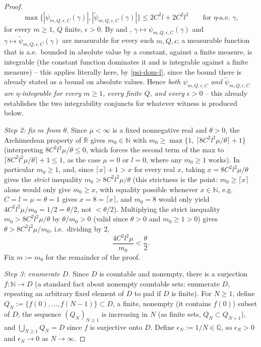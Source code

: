 \begin{proof}
  \begin{equation}\label{psi-dom-l}
    \max\{|\psi_{m,Q,\epsilon,C}(\gamma)|, |\tilde\psi_{m,Q,\epsilon,C}(\gamma)|\} \le 2C^2l+2C^2l^2
    \qquad\text{for } \eta\text{-a.e.\ }\gamma
    ,
  \end{equation}
  for every $m\ge1$, $Q$ finite, $\epsilon>0$. By  and
  , $\gamma\mapsto\psi_{m,Q,\epsilon,C}(\gamma)$ and
  $\gamma\mapsto\tilde\psi_{m,Q,\epsilon,C}(\gamma)$ are measurable for every such $m,Q,\epsilon$; a
  measurable function that is a.e.\ bounded in absolute value by a constant, against a finite
  measure, is integrable (the constant function dominates it and is integrable against a finite
  measure) -- this applies literally here, by \eqref{psi-dom-l}, since the bound there is already
  stated as a bound on absolute values. Hence \emph{both $\psi_{m,Q,\epsilon,C}$ and
  $\tilde\psi_{m,Q,\epsilon,C}$ are
  $\eta$-integrable for every $m\ge1$, every finite $Q$, and every $\epsilon>0$} -- this already
  establishes the two integrability conjuncts for whatever witness is produced below.

  \emph{Step 2: fix $m$ from $\theta$.} Since $\mu<\infty$ is a fixed nonnegative real and $\theta>0$,
  the Archimedean property of $\mathbb{R}$ gives $m_0 \in \mathbb{N}$ with
  $m_0 \ge \max\{1,\ \lceil 8C^2l^2\mu/\theta\rceil+1\}$ (interpreting $8C^2l^2\mu/\theta \le 0$, which
  forces the second term of the max to $\lceil 8C^2l^2\mu/\theta\rceil+1 \le 1$, as the case $\mu=0$
  or $l=0$, where any $m_0\ge1$ works). In particular $m_0\ge1$, and, since
  $\lceil x\rceil+1 > x$ for every real $x$, taking $x=8C^2l^2\mu/\theta$ gives the \emph{strict}
  inequality $m_0 > 8C^2l^2\mu/\theta$ (this strictness is the point: $m_0\ge\lceil x\rceil$ alone
  would only give $m_0\ge x$, with equality possible whenever $x\in\mathbb{N}$, e.g.\
  $C=l=\mu=\theta=1$ gives $x=8=\lceil x\rceil$, and $m_0=8$ would only yield
  $4C^2l^2\mu/m_0=1/2=\theta/2$, not $<\theta/2$). Multiplying the strict inequality
  $m_0>8C^2l^2\mu/\theta$ by $\theta/m_0>0$ (valid since $\theta>0$ and $m_0\ge1>0$) gives
  $\theta > 8C^2l^2\mu/m_0$, i.e.\ dividing by $2$,
  \begin{equation}\label{m-choice}
    \frac{4C^2l^2\mu}{m_0} < \frac\theta2
    .
  \end{equation}
  Fix $m := m_0$ for the remainder of the proof.

  \emph{Step 3: enumerate $D$.} Since $D$ is countable and nonempty, there is a surjection
  $f : \mathbb{N} \to D$ (a standard fact about nonempty countable sets: enumerate $D$, repeating an
  arbitrary fixed element of $D$ to pad if $D$ is finite). For $N \ge 1$, define $Q_N :=
  \{f(0),\dots,f(N-1)\} \subset D$, a finite, nonempty (it contains $f(0)$) subset of $D$; the
  sequence $(Q_N)_{N\ge1}$ is increasing in $N$ (as finite sets, $Q_N \subset Q_{N+1}$), and
  $\bigcup_{N\ge1} Q_N = D$ since $f$ is surjective onto $D$. Define $\epsilon_N := 1/N \in
  \mathbb{Q}$, so $\epsilon_N > 0$ and $\epsilon_N \to 0$ as $N \to \infty$.


\end{proof}
